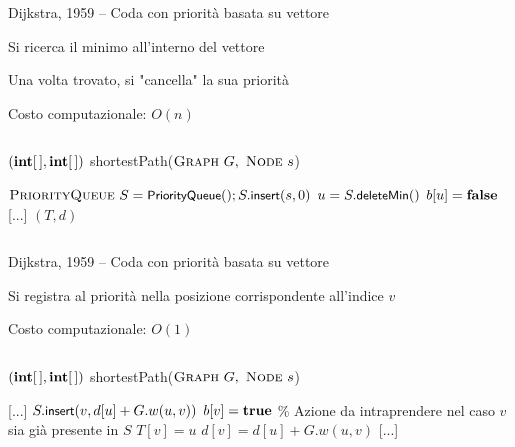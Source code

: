 \begin{frame}{Dijkstra, 1959 -- Coda con priorità basata su vettore}

\smallskip
{}
\BI
\item Si ricerca il minimo all'interno del vettore
\item Una volta trovato, si "cancella" la sua priorità
\item Costo computazionale: $O(n)$
\EI

\vspace{-18pt}
\begin{columns}
\small
\begin{Procedure}
\caption[A]{$(\INTARRAY, \INTARRAY)$ \textsf{shortestPath}($\textsc{Graph}\ G,\ \textsc{Node}\ s$)}
$\textsc{PriorityQueue}\ S = \textsf{{\small PriorityQueue}}(); S.\textsf{{\small insert}}(s, 0)$\;
{
  \alert{$u = S.\textsf{{\small deleteMin}}()$}\;
  $b[u] = \FALSE$\;
  {
    {
      [...]
    }
  }
}
\Return $(T,d)$
\end{Procedure}
\end{columns}

\end{frame}

\begin{frame}{Dijkstra, 1959 -- Coda con priorità basata su vettore}

\smallskip
{}
\BI
\item Si registra al priorità nella posizione corrispondente all'indice $v$
\item Costo computazionale: $O(1)$
\EI

\vspace{-18pt}
\begin{columns}
\small
\begin{Procedure}
\caption[A]{$(\INTARRAY, \INTARRAY)$ \textsf{shortestPath}($\textsc{Graph}\ G,\ \textsc{Node}\ s$)}
[...]\;
    {
      {
        \alert{$S.\textsf{{\small insert}}(v, d[u]+G.w(u,v))$}\;
        $b[v] = \TRUE$\;
      }
      {
        \% Azione da intraprendere nel caso $v$ sia già presente in $S$
      }
      $T[v] = u$\;
      $d[v] = d[u] + G.w(u,v)$\;
    }
[...]\;
\end{Procedure}
\end{columns}

\end{frame}

